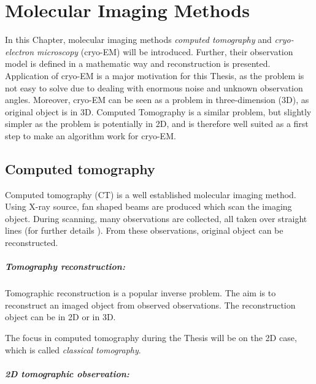 \chapter{Molecular Imaging Methods}
\label{sec:imaging}

In this Chapter, molecular imaging methods \textit{computed tomography} and 
\textit{cryo-electron microscopy} (cryo-EM) will be introduced. 
Further, their observation model is defined in a mathematic way and reconstruction is presented.
Application of cryo-EM is a major motivation for this Thesis, 
as the problem is not easy to solve due to dealing with enormous noise and unknown observation angles.
Moreover, cryo-EM can be seen as a problem in three-dimension (3D), as original object is in 3D.
Computed Tomography is a similar problem, but slightly simpler as the problem is potentially in 2D, and is therefore well suited as a
first step to make an algorithm work for cryo-EM. 


\section{Computed tomography}
Computed tomography (CT) is a well established molecular imaging method.
Using X-ray source, fan shaped beams are produced which scan the imaging object.
During scanning, many observations are collected, all taken over straight lines (for further details \cite{computedTomography}).
From these observations, original object can be reconstructed.

\paragraph{Tomography reconstruction:}
Tomographic reconstruction \cite{tomographicReconstruction} is a popular inverse problem. 
The aim is to reconstruct an imaged object from observed observations.
The reconstruction object can be in 2D or in 3D. 

\begin{tcolorbox}[colback=red!5!white,colframe=red!75!black]
    The focus in computed tomography during the Thesis will be on the 2D case, which is called \textit{classical tomography}.
\end{tcolorbox}

\pagebreak

\paragraph{2D tomographic observation:}

